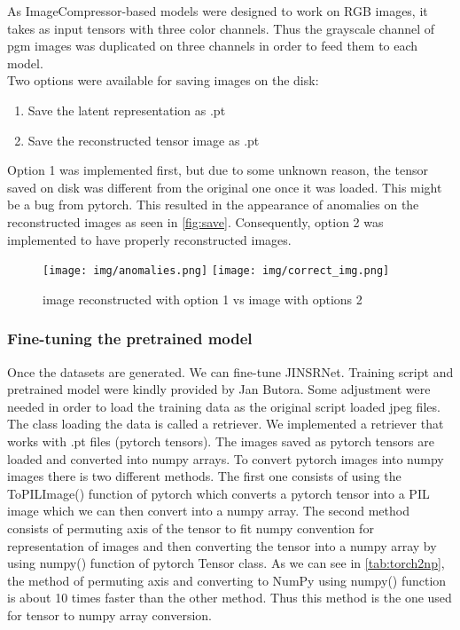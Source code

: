 \documentclass[12pt]{article}
\begin{document}
As ImageCompressor-based models were designed to work on RGB images, it takes as input tensors with three color channels. Thus the grayscale channel of pgm images was duplicated on three channels \autocite{butoraStatisticalModelsImage2017} in order to feed them to each model.\\
Two options were available for saving images on the disk:
\begin{enumerate}
    \item Save the latent representation as .pt
    \item Save the reconstructed tensor image as .pt
\end{enumerate}
Option 1 was implemented first, but due to some unknown reason, the tensor saved on disk was different from the original one once it was loaded. This might be a bug from pytorch. This resulted in the appearance of anomalies on the reconstructed images as seen in \autoref{fig:save}. Consequently, option 2 was implemented to have properly reconstructed images.
\begin{figure}[H]
    \texttt{[image: img/anomalies.png]}
    \texttt{[image: img/correct\_img.png]}
    \caption[Image reconstructed from tensor saved on disk]{image reconstructed with option 1 vs image with options 2}
    \label{fig:save}
\end{figure}

\subsubsection{Fine-tuning the pretrained model}
Once the datasets are generated. We can fine-tune JINSRNet.
Training script and pretrained model were kindly provided by Jan Butora. Some adjustment were needed in order to load the training data as the original script loaded jpeg files. The class loading the data is called a retriever. We implemented a retriever that works with .pt files (pytorch tensors). The images saved as pytorch tensors are loaded and converted into numpy arrays. To convert pytorch images into numpy images there is two different methods. The first one consists of using the ToPILImage() function of pytorch which converts a pytorch tensor into a PIL image which we can then convert into a numpy array. The second method consists of permuting axis of the tensor to fit numpy convention for representation of images and then converting the tensor into a numpy array by using numpy() function of pytorch Tensor class. As we can see in \autoref{tab:torch2np}, the method of permuting axis and converting to NumPy using numpy() function is about 10 times faster than the other method. Thus this method is the one used for tensor to numpy array conversion.\\
\end{document}
